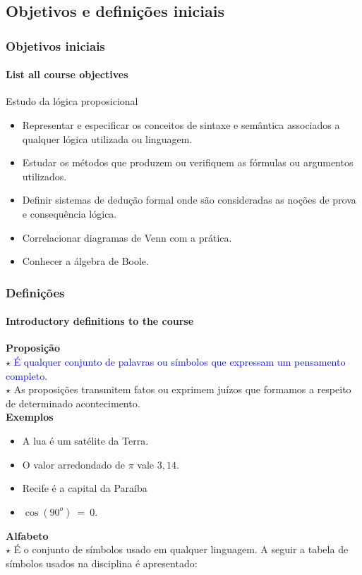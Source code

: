 \documentclass[10pt]{beamer}
\begin{document}
\subsection{Objetivos e definições iniciais}
%
\begin{frame}[c]
    \frametitle{Objetivos iniciais}
    \framesubtitle{List all course objectives}
    \begin{alertblock}{Estudo da lógica proposicional}
        \begin{itemize}
            \item Representar e especificar os conceitos de sintaxe e semântica associados a qualquer lógica utilizada ou linguagem.
            \item Estudar os métodos que produzem ou verifiquem as fórmulas ou argumentos utilizados.
            \item Definir sistemas de dedução formal onde são consideradas as noções de prova e consequência lógica.
            \item Correlacionar diagramas de Venn com a prática.
            \item Conhecer a álgebra de Boole.
        \end{itemize}
    \end{alertblock}
\end{frame}
%
\begin{frame}[t]
    \frametitle{Definições}
    \framesubtitle{Introductory definitions to the course}
    \textbf{Proposição}\\
    \quad $\star$ \textcolor{blue}{É qualquer conjunto de palavras ou símbolos que expressam um pensamento completo.}\\
    \quad $\star$ As proposições transmitem fatos ou exprimem juízos que formamos a respeito de determinado acontecimento.\\ \pause
    \textbf{Exemplos}
    \begin{itemize}
        \item A lua é um satélite da Terra.\pause
        \item O valor arredondado de $\pi$ vale $3,14$.\pause
        \item Recife é a capital da Paraíba\pause
        \item $\cos(90^o)~=~0$.\pause
    \end{itemize}
    \textbf{Alfabeto}\\
    \quad $\star$ É o conjunto de símbolos usado em qualquer linguagem. A seguir a tabela de símbolos usados na disciplina é apresentado:
\end{frame}
\end{document}
